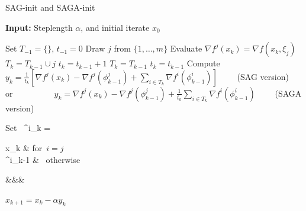 \documentclass[11pt]{article}
\begin{document}
% 

\bigskip
\begin{algorithm}
	[H] 
	\caption{SAG-init and SAGA-init}
	\label{alg:sagInit}
	{\bf Input:} Steplength $ \alpha $, and initial iterate $x_0$
	\begin{algorithmic}
		[1] 
		\State Set $T_{-1} = \{\}$, $t_{-1} = 0$ 
		\State Draw $j$ from $\{ 1, \ldots ,m\}$ 
		\State Evaluate $\nabla f^j(x_k) = \nabla f(x_k, \xi_j) $
		\State $T_{k} = T_{k-1} \cup  j$
		\State $t_{k}=t_{k-1}+1$
		\Else
		\State $T_{k} = T_{k-1}$
		\State $t_{k}=t_{k-1}$
		\EndIf 
           \State Compute $y_k =  \frac{1}{t_k} \left[ \nabla f^j(x_k) -  \nabla f^j(\phi_{k-1}^j) + \sum_{i \in T_k}  \nabla f^i (\phi^i_{k-1}) \right]\qquad$  (SAG version)
           \State or~~~~~~~~~~$y_k = \nabla f^j(x_k) -  \nabla f^j(\phi_{k-1}^j) +  \frac{1}{t_k} \sum_{i \in T_k}  \nabla f^i (\phi^i_{k-1})\qquad$ (SAGA version)
		\State \begin{flalign}   \mbox{Set   }  \phi^i_k =
		\begin{cases} 
  x_k & \mbox{for $i =j$ } \\
  \phi^i_{k-1} & \mbox{ otherwise} 
 \end{cases}&&&
\end{flalign}
		\State $x_{k+1} = x_k - \alpha y_k$ 
		\EndLoop 
	\end{algorithmic}
\end{algorithm}
\end{document}
